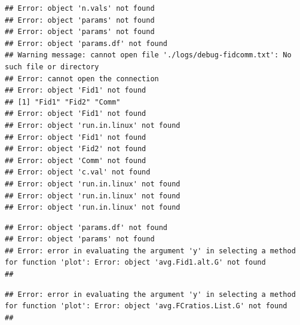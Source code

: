 \documentclass[11pt]{article} %
\begin{document}
\begin{knitrout}
\color{fgcolor}\begin{kframe}
\begin{verbatim}
## Error: object 'n.vals' not found
## Error: object 'params' not found
## Error: object 'params' not found
## Error: object 'params.df' not found
## Warning message: cannot open file './logs/debug-fidcomm.txt': No such file or directory
## Error: cannot open the connection
## Error: object 'Fid1' not found
## [1] "Fid1" "Fid2" "Comm"
## Error: object 'Fid1' not found
## Error: object 'run.in.linux' not found
## Error: object 'Fid1' not found
## Error: object 'Fid2' not found
## Error: object 'Comm' not found
## Error: object 'c.val' not found
## Error: object 'run.in.linux' not found
## Error: object 'run.in.linux' not found
## Error: object 'run.in.linux' not found
\end{verbatim}
\end{kframe}
\end{knitrout}


\begin{knitrout}
\color{fgcolor}\begin{kframe}
\begin{verbatim}
## Error: object 'params.df' not found
## Error: object 'params' not found
## Error: error in evaluating the argument 'y' in selecting a method for function 'plot': Error: object 'avg.Fid1.alt.G' not found
## 
\end{verbatim}
\end{kframe}
\end{knitrout}


\begin{knitrout}
\color{fgcolor}\begin{kframe}
\begin{verbatim}
## Error: error in evaluating the argument 'y' in selecting a method for function 'plot': Error: object 'avg.FCratios.List.G' not found
## 
\end{verbatim}
\end{kframe}
\end{knitrout}

\end{document}
